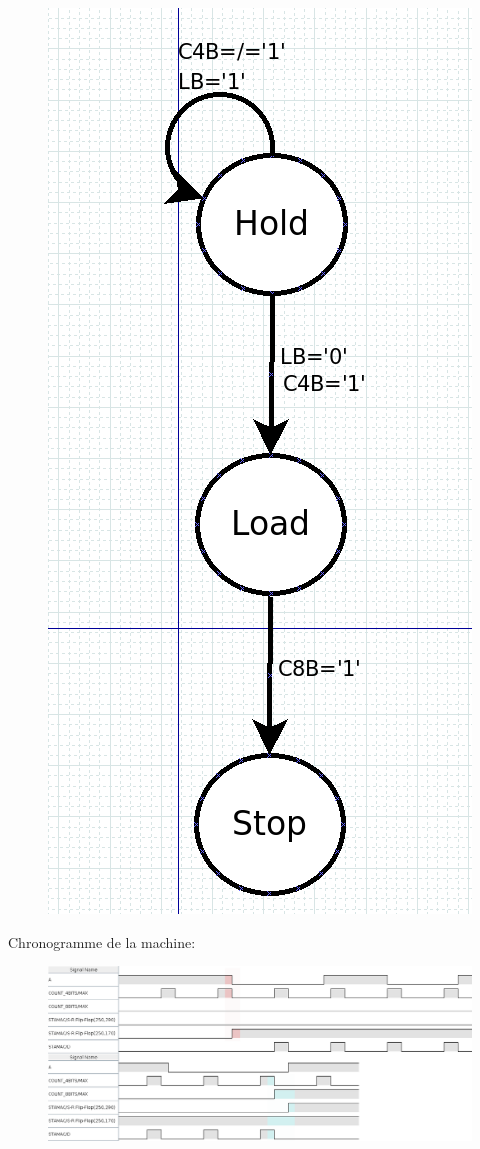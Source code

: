 \documentclass[a4paper]{article} %
\begin{document}
\begin{figure}[H]
\centering
    \includegraphics[width=.8\textwidth]{src/stamac2.png}
    \label{fig:stamac2}
\end{figure}
Chronogramme de la machine:
\begin{figure}[H]
\centering
    \includegraphics[width=.8\textwidth]{src/CHRONO_STAMAC_4_colorized.png}
    \label{fig:stamac}
\end{figure}
\end{document}
